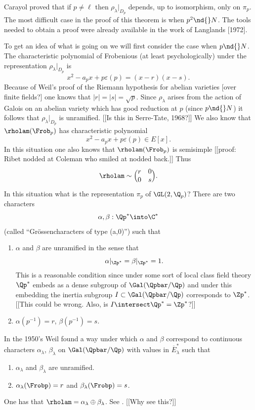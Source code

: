 \documentclass{report}
\begin{document}
Carayol proved that if $p\neq\ell$ then $\rho_{\lambda}|_{D_p}$ depends,
up to isomorphism, only on $\pi_p$. The most difficult
case in the proof of this theorem is when $p^2\nd{}N$.
The tools needed to obtain a proof
were already available in the work of Langlands [1972].

To get an idea of what is going on we will first consider the case when
$p\nd{}N$. The characteristic polynomial of Frobenious (at least psychologically)
under the representation $\rho_{\lambda}|_{D_p}$ is
$$x^2-a_px+p\varepsilon(p)=(x-r)(x-s).$$
Because of Weil's proof of the Riemann hypothesis for abelian varieties [over
finite fields?] one knows that
$|r|=|s|=\sqrt{p}$. Since $\rho_{\lambda}$ arises from the action of
Galois on an abelian variety which has good
reduction at $p$ (since $p\nd{}N$) it follows that $\rho_{\lambda}|_{D_p}$
is unramified. [[Is this in Serre-Tate, 1968?]] We also know that
$\rholam(\Frob_p)$ has characteristic polynomial
$$x^2-a_px+p\varepsilon(p)\in E[x].$$
In this situation one also knows that $\rholam(\Frob_p)$ is semisimple
[[proof: Ribet nodded at Coleman who smiled at nodded back.]] Thus
$$\rholam\sim\Bigl(\begin{matrix}r&0\\0&s\end{matrix}\Bigr).$$ In
this situation what is the representation $\pi_p$ of $\GL(2,\Q_p)$?
There are two characters
$$\alpha,\beta:\Qp^*\into\C^*$$
(called ``Gr\"ossencharacters of type (a,0)'') such that
\begin{enumerate}
\item $\alpha$ and $\beta$ are unramified in the sense that
$$\alpha|_{\Zp^*}=\beta|_{\Zp^*}=1.$$
This is a reasonable condition since under some sort of local
class field theory $\Qp^*$ embeds as a dense subgroup of
$\Gal(\Qpbar/\Qp)$ and under this embedding the inertia
subgroup $I\subset\Gal(\Qpbar/\Qp)$ corresponds to
$\Zp^*$. [[This could be wrong. Also, is $I\intersect\Qp^*=\Zp^*$?]]
\item $\alpha(p^{-1})=r$, $\beta(p^{-1})=s$.
\end{enumerate}

In the 1950's Weil found a way under which $\alpha$
and $\beta$ correspond to
continuous characters $\alpha_{\lambda}$, $\beta_{\lambda}$
on $\Gal(\Qpbar/\Qp)$
with values in $\overline{E}_{\lambda}^*$ such that
\begin{enumerate}
\item $\alpha_{\lambda}$ and $\beta_{\lambda}$ are unramified.
\item $\alpha_{\lambda}(\Frobp)=r$ and $\beta_{\lambda}(\Frobp)=s$.
\end{enumerate}
One has that $\rholam=\alpha_{\lambda}\oplus\beta_{\lambda}$.
See \cite{serre-tate}. [[Why see this?]]
\end{document}
